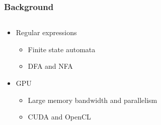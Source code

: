 \documentclass{beamer}
\begin{document}
\begin{frame}[fragile=singleslide]\frametitle{Background}
	\begin{columns}
		\begin{column}{0.45\textwidth}
			\begin{itemize}
				\item Regular expressions
				      \begin{itemize}
					      \item Finite state automata
					      \item DFA and NFA
				      \end{itemize}
				\item GPU
				      \begin{itemize}
					      \item Large memory bandwidth and parallelism
					      \item CUDA and OpenCL
				      \end{itemize}
			\end{itemize}
		\end{column}


\end{columns}
\end{frame}
\end{document}
